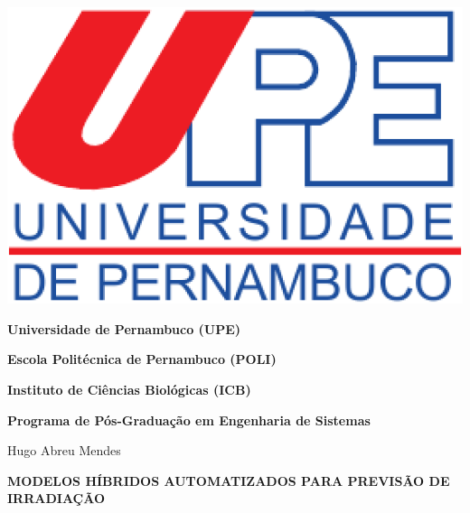\begin{center}
\begin{minipage}[b]{0.15\linewidth}
\end{minipage} \hfill
\begin{minipage}[b]{0.15\linewidth}
\includegraphics[width=\textwidth]{Figuras/Capa/upelogo.eps}
\end{minipage}

{\textbf{Universidade de Pernambuco (UPE)}}%

{\textbf{Escola Politécnica de Pernambuco (POLI)}}%

{\textbf{Instituto de Ciências Biológicas (ICB)}} \\ \vspace{2ex}

{\textbf{Programa de Pós-Graduação em Engenharia de Sistemas}} \\ \vspace{1ex}

\vspace{0.8in}

{\Large Hugo Abreu Mendes}\\

\vspace{1in}

{\Large \textbf{MODELOS HÍBRIDOS AUTOMATIZADOS PARA PREVISÃO DE IRRADIAÇÃO}} \\

\vspace{0.3in}




\end{center}

